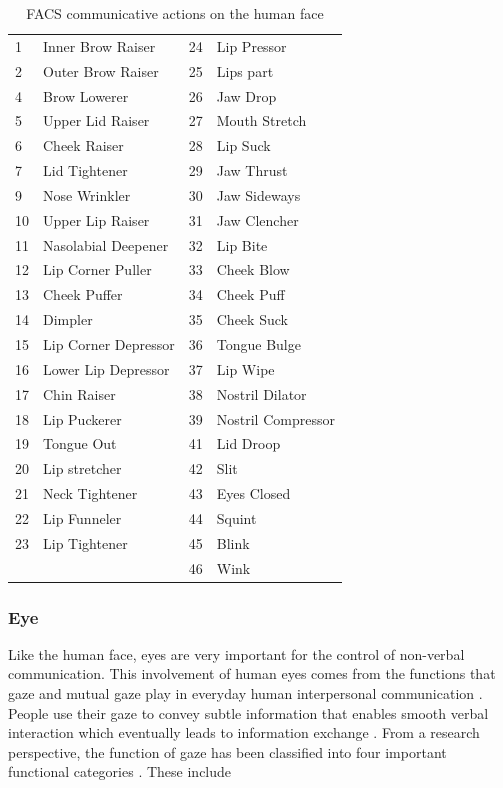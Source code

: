 \documentclass[oneside,11pt]{memoir}
\begin{document}
\begin{table}[hpdf]
\begin{center}
\caption{FACS communicative actions on the human face}
\label{Tab:Table2}
\begin{tabular}{|l|l||l|l|}
\hline
1 & Inner Brow Raiser & 24 & Lip Pressor\\
2 & Outer Brow Raiser & 25 & Lips part\\
4 & Brow Lowerer & 26 & Jaw Drop\\
5 & Upper Lid Raiser & 27 & Mouth Stretch \\
6 & Cheek Raiser & 28 & Lip Suck\\
7 & Lid Tightener & 29 & Jaw Thrust \\
9 & Nose Wrinkler & 30 & Jaw Sideways \\
10 & Upper Lip Raiser & 31 & Jaw Clencher\\
11 & Nasolabial Deepener & 32 & Lip Bite \\
12 & Lip Corner Puller & 33 & Cheek Blow \\
13 & Cheek Puffer & 34 & Cheek Puff \\
14 & Dimpler & 35 & Cheek Suck \\
15 & Lip Corner Depressor & 36 & Tongue Bulge \\
16 & Lower Lip Depressor & 37 & Lip Wipe\\
17 & Chin Raiser & 38 & Nostril Dilator \\
18 & Lip Puckerer & 39 & Nostril Compressor\\
19 & Tongue Out & 41 & Lid Droop \\
20 & Lip stretcher & 42 & Slit\\
21 & Neck Tightener & 43 & Eyes Closed\\
22 & Lip Funneler & 44 & Squint\\
23 & Lip Tightener & 45 & Blink\\
& & 46 & Wink\\
\hline
\end{tabular}
\end{center}
\end{table}

\subsubsection{Eye}
Like the human face, eyes are very important for the control of non-verbal communication. This involvement of human eyes comes from the functions that gaze and mutual gaze play in everyday human interpersonal communication \cite{argyle_gaze_1976}. People use their gaze to convey subtle information that enables smooth verbal interaction which eventually leads to information exchange \cite{kleinke_gaze_1986}. From a research perspective, the function of gaze has been classified into four important functional categories \cite{kendon_functions_1967}. These include
\end{document}
